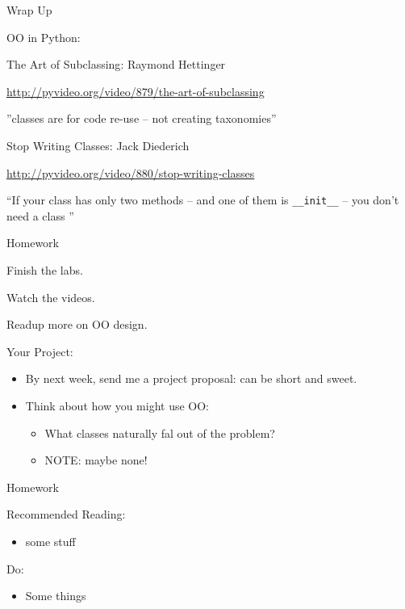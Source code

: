 \documentclass{beamer}
\begin{document}
\begin{frame}[fragile]{Wrap Up}

{\Large OO in Python:}

\vfill
{\Large The Art of Subclassing}: Raymond Hettinger

\vfill
{\small \url{http://pyvideo.org/video/879/the-art-of-subclassing}}

\vfill
''classes are for code re-use -- not creating taxonomies''

\vfill
{\Large Stop Writing Classes}: Jack Diederich

\vfill
{\small \url{http://pyvideo.org/video/880/stop-writing-classes}}

\vfill
``If your class has only two methods -- and one of them is \verb|__init__|
-- you don't need a class ''
\end{frame}

\begin{frame}[fragile]{Homework}

{\Large Finish the labs.}

\vfill
{\Large Watch the videos.}

\vfill
{\Large Readup more on OO design.}


\vfill
{\LARGE Your Project:}
\begin{itemize}
  \item By next week, send me a project proposal: can be short and sweet.
  \item Think about how you might use OO:
  \begin{itemize}
    \item What classes naturally fal out of the problem?
    \item NOTE: maybe none!
  \end{itemize}
\end{itemize}

\end{frame}
 





\begin{frame}[fragile]{Homework}

Recommended Reading:
\begin{itemize}
  \item some stuff
\end{itemize}

Do:
\begin{itemize}
    \item Some things    
\end{itemize}

\end{frame}
\end{document}
